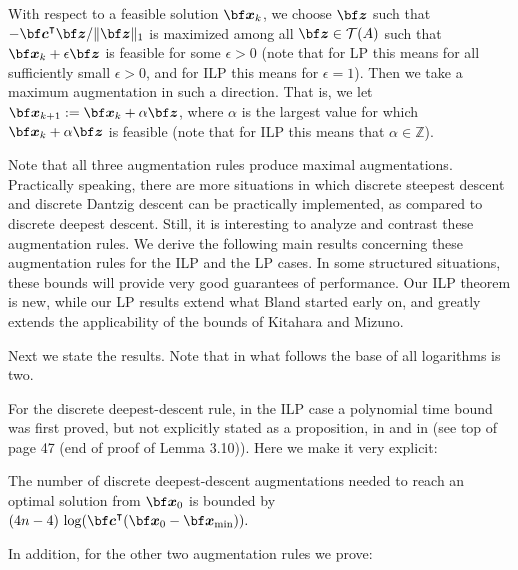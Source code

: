 \documentclass[moor]{informs1hack}              %
\newcommand{\Z}{{\mathbb Z}}
\def\ve#1{\mathchoice{\mbox{\boldmath$\displaystyle\bf#1$}}
{\mbox{\boldmath$\textstyle\bf#1$}}
{\mbox{\boldmath$\scriptstyle\bf#1$}}
{\mbox{\boldmath$\scriptscriptstyle\bf#1$}}}
\newcommand\vecc{{\ve c}}
\newcommand\vex{{\ve x}}
\newcommand\vez{{\ve z}}
\newcommand{\T}{{\intercal}} %
\begin{document}
  \begin{definition}
    With respect to a feasible solution $\vex_k$, we choose  $\vez$ such that $-\vecc^\T\vez/\|\vez\|_1$  is maximized among all $\vez\in\cal T(A)$ such that $\vex_k + \epsilon \vez$ is feasible for some $\epsilon>0$ (note that for LP this means for all sufficiently small $\epsilon>0$, and for ILP this means for $\epsilon=1$). Then we take a maximum augmentation  in such a direction. That is, we let $\vex_{k+1} := \vex_k + \alpha \vez$, where $\alpha$ is the largest value for which $\vex_k + \alpha \vez$ is feasible  (note that for ILP this means that $\alpha\in\Z$).
  \end{definition}

\medskip

Note that all three augmentation rules produce maximal augmentations. Practically speaking, there are more situations in which discrete steepest descent and 
discrete Dantzig descent can be practically implemented, as compared to discrete deepest descent. Still, it is interesting to analyze and contrast these augmentation rules.
We derive the following main results concerning these augmentation rules for the ILP and the LP cases. In some structured situations, these bounds will provide very 
good guarantees of performance. Our ILP theorem is new, while our LP results extend what Bland started early on, and greatly extends the applicability of the 
bounds of Kitahara and Mizuno. 

Next we state the results. Note that in what follows the base of all logarithms is two.

For the discrete deepest-descent rule, in the ILP case a polynomial time bound was first proved, but not explicitly stated as a proposition, in \cite{Hemmecke+Onn+Weismantel:oracle} and in \cite{onn:nonlinear-discrete-monograph} (see top of page 47 (end of proof of Lemma 3.10)).  Here we make it very explicit:

\begin{lemma} \label{ILP-greedy}
The number of discrete deepest-descent augmentations needed to reach an optimal solution from $\vex_0$ is bounded by $(4n-4)\,\log(\vecc^\T (\vex_0-\vex_{\min})).$
\end{lemma}

In addition, for the other two augmentation rules we prove:
\end{document}
